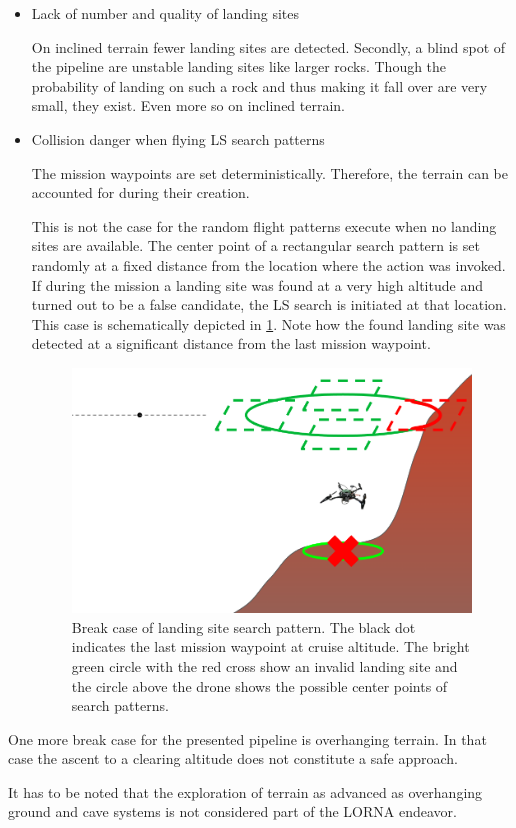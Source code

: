 \begin{itemize}
    \item Lack of number and quality of landing sites

    On inclined terrain fewer landing sites are detected. Secondly, a blind spot of the pipeline are unstable landing sites like larger rocks. Though the probability of landing on such a rock and thus making it fall over are very small, they exist. Even more so on inclined terrain.

    \item Collision danger when flying LS search patterns

    The mission waypoints are set deterministically. Therefore, the terrain can be accounted for during their creation. 
    
    This is not the case for the random flight patterns execute when no landing sites are available. The center point of a rectangular search pattern is set randomly at a fixed distance from the location where the action was invoked. If during the mission a landing site was found at a very high altitude and turned out to be a false candidate, the LS search is initiated at that location. This case is schematically depicted in \cref{fig:search_pattern_collision}. Note how the found landing site was detected at a significant distance from the last mission waypoint. 

    \begin{figure}[h]
        \centering
        \includegraphics[scale=0.35]{images/evaluation/search_pattern_collision.png}
        \caption{Break case of landing site search pattern. The black dot indicates the last mission waypoint at cruise altitude. The bright green circle with the red cross show an invalid landing site and the circle above the drone shows the possible center points of search patterns.}
        \label{fig:search_pattern_collision}
    \end{figure}
\end{itemize}

One more break case for the presented pipeline is overhanging terrain. In that case the ascent to a clearing altitude does not constitute a safe approach.

It has to be noted that the exploration of terrain as advanced as overhanging ground and cave systems is not considered part of the LORNA endeavor.